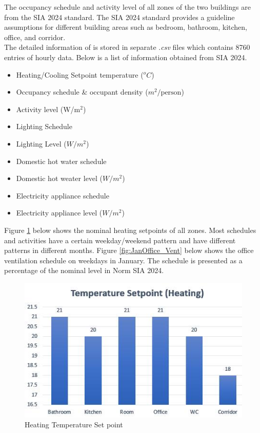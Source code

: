 \documentclass[a4paper, oneside]{discothesis}
\begin{document}
		The occupancy schedule and activity level of all zones of the two buildings are from the SIA 2024 standard. The SIA 2024 standard provides a guideline assumptions for different building areas such as bedroom, bathroom, kitchen, office, and corridor.\\

		The detailed information of is stored in separate .\textit{csv} files which contains 8760 entries of hourly data. Below is a list of information obtained from SIA 2024.

	\begin{itemize}
		\item Heating/Cooling Setpoint temperature ($^oC$)
		\item Occupancy schedule \& occupant density ($m^2/\text{person}$)
		\item Activity level (W/m$^2$)
		\item Lighting Schedule
		\item Lighting Level ($W/m^2$)
		\item Domestic hot water schedule 
		\item Domestic hot weater level ($W/m^2$)
		\item Electricity appliance schedule
		\item Electricity appliance level ($W/m^2$)
	\end{itemize}


		Figure \ref{fig:HeatingSP} below shows the nominal heating setpoints of all zones. Most schedules and activities have a certain weekday/weekend pattern and have different patterns in different months. Figure \ref{fig:JanOffice_Vent} below shows the office ventilation schedule on weekdays in January. The schedule is presented as a percentage of the nominal level in Norm SIA 2024.\\
		
		\begin{figure}[H]
		\centering
		\includegraphics[scale=1.1]{TempSetpoint.jpg}
		\caption{Heating Temperature Set point}
		\label{fig:HeatingSP}
		\end{figure}
		
\end{document}
